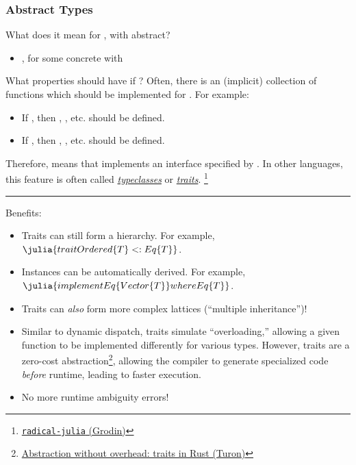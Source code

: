 \documentclass[8pt]{beamer}
\begin{document}
\begin{frame}
  \frametitle{Abstract Types}

  What does it mean for , with  abstract?
  \begin{itemize}
    \item {}, for some concrete  with 
  \end{itemize}

  What properties should  have if ? Often, there is an (implicit) collection of functions which should be implemented for . For example:
  \begin{itemize}
    \item If , then , , etc. should be defined.
    \item If , then , , etc. should be defined.
  \end{itemize}

  Therefore,  means that  implements an interface specified by . In other languages, this feature is often called \emph{\href{http://learnyouahaskell.com/types-and-typeclasses}{typeclasses}} or \emph{\href{https://doc.rust-lang.org/book/ch10-02-traits.html}{traits}}.%
  \footnote{\href{https://github.com/HarrisonGrodin/radical-julia}{\texttt{radical-julia} (Grodin)}}

  \noindent\rule{\linewidth}{0.4pt}

  Benefits:
  \begin{itemize}
    \item Traits can still form a hierarchy. For example, $\julia{trait Ordered\{T\} <: Eq\{T\}}$.
    \item Instances can be automatically derived. For example, $\julia{implement Eq\{Vector\{T\}\} where Eq\{T\}}$.
    \item Traits can \emph{also} form more complex lattices (``multiple inheritance'')!
    \item Similar to dynamic dispatch, traits simulate ``overloading,'' allowing a given function to be implemented differently for various types. However, traits are a zero-cost abstraction\footnote{\href{https://blog.rust-lang.org/2015/05/11/traits.html}{Abstraction without overhead: traits in Rust (Turon)}}, allowing the compiler to generate specialized code \emph{before} runtime, leading to faster execution.
    \item No more runtime ambiguity errors!
  \end{itemize}
\end{frame}
\end{document}
